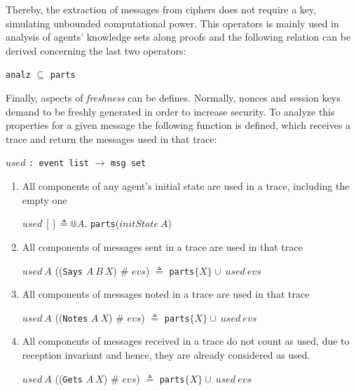 Thereby, the extraction of messages from ciphers does not require a key, simulating unbounded computational power. This operators is mainly used in analysis of agents' knowledge sets along proofs and the following relation can be derived concerning the last two operators:

\begin{center}
  \texttt{analz} $\subseteq$ \texttt{parts}
\end{center}

Finally, aspects of \textit{freshness} can be defines. Normally, nonces and session keys demand to be freshly generated in order to increase security. To analyze this properties for a given message the following function is defined, which receives a trace and return the messages used in that trace:

\begin{center}
  $used$ \texttt{: event list} $\longrightarrow$ \texttt{msg set}
\end{center}

\begin{enumerate}
  \item All components of any agent's initial state are used in a trace, including the empty one
  \begin{center}
    $used\ [] \triangleq \Cup A.$ \texttt{parts}($initState\ A$)
  \end{center}
  \item All components of messages sent in a trace are used in that trace
  \begin{center}
    $used\ A$ ((\texttt{Says} $A\ B\ X$) \# $evs$) $\triangleq$ \texttt{parts}$\{X\} \cup\ used\ evs$
  \end{center}
  \item All components of messages noted in a trace are used in that trace
  \begin{center}
    $used\ A$ ((\texttt{Notes} $A\ X$) \# $evs$) $\triangleq$ \texttt{parts}$\{X\} \cup\ used\ evs$
  \end{center}
  \item All components of messages received in a trace do not count as used, due to reception invariant and hence, they are already considered as used.
  \begin{center}
    $used\ A$ ((\texttt{Gets} $A\ X$) \# $evs$) $\triangleq$ \texttt{parts}$\{X\} \cup\ used\ evs$
  \end{center}
\end{enumerate}



